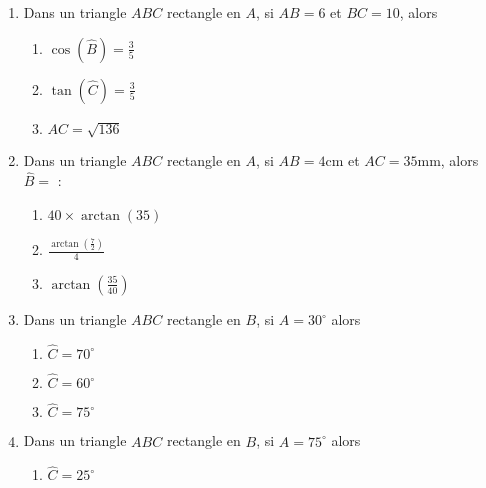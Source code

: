 \documentclass[oneside,twoside]{book}
\begin{document}
\begin{enumerate}
\item Dans un triangle $ABC$ rectangle en $A$, si $AB=6$ et $BC=10$, alors

\begin{enumerate}

\item\BonneReponse $\cos (\hat{B})=\frac{3}{5}$
\item\MauvaiseReponse $\tan (\hat{C})=\frac{3}{5}$

\item\MauvaiseReponse $AC=\sqrt{136}$


\end{enumerate}



\item Dans un triangle $ABC$ rectangle en $A$, si $AB=4\mathrm{cm}$ et $AC=35\mathrm{mm}$, alors $\hat{B}=$ :

\begin{enumerate}

\item\MauvaiseReponse $40\times\arctan\left(35\right)$


\item\MauvaiseReponse $\frac{\arctan\left(\frac{7}{2}\right)}{4}$
\item\BonneReponse $\arctan\left(\frac{35}{40}\right)$

\end{enumerate}



\item Dans un triangle $ABC$ rectangle en $B$, si $\widehat{A}=30^{\circ}$ alors

\begin{enumerate}

\item\MauvaiseReponse $\widehat{C}=70^{\circ}$

\item\BonneReponse $\widehat{C}=60^{\circ}$
\item\MauvaiseReponse $\widehat{C}=75^{\circ}$


\end{enumerate}




\item Dans un triangle $ABC$ rectangle en $B$, si $\widehat{A}=75^{\circ}$ alors

\begin{enumerate}

\item\MauvaiseReponse $\widehat{C}=25^{\circ}$


\end{enumerate}
\end{enumerate}
\end{document}
